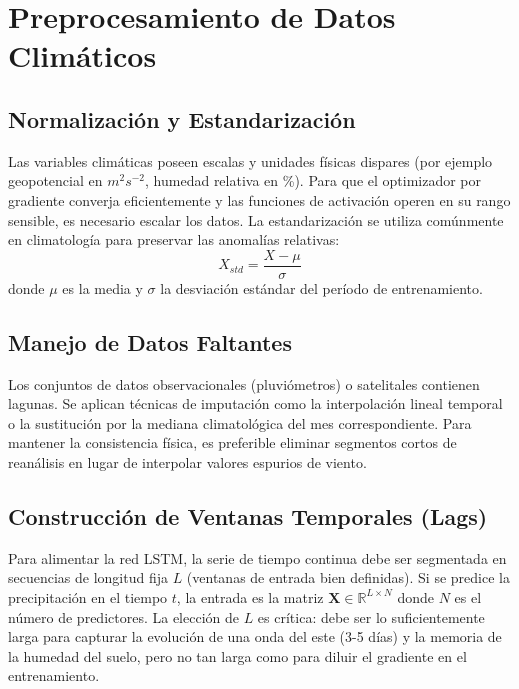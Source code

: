 \section{Preprocesamiento de Datos Climáticos}

\subsection{Normalización y Estandarización}
Las variables climáticas poseen escalas y unidades físicas dispares (por ejemplo geopotencial en \(m^2 s^{-2}\), humedad relativa en \%). Para que el optimizador por gradiente converja eficientemente y las funciones de activación operen en su rango sensible, es necesario escalar los datos. La estandarización se utiliza comúnmente en climatología para preservar las anomalías relativas:
\begin{equation}
    X_{std} = \frac{X - \mu}{\sigma}
\end{equation}
donde \(\mu\) es la media y \(\sigma\) la desviación estándar del período de entrenamiento.

\subsection{Manejo de Datos Faltantes}
Los conjuntos de datos observacionales (pluviómetros) o satelitales contienen lagunas. Se aplican técnicas de imputación como la interpolación lineal temporal o la sustitución por la mediana climatológica del mes correspondiente. Para mantener la consistencia física, es preferible eliminar segmentos cortos de reanálisis en lugar de interpolar valores espurios de viento.

\subsection{Construcción de Ventanas Temporales (Lags)}
Para alimentar la red LSTM, la serie de tiempo continua debe ser segmentada en secuencias de longitud fija \(L\) (ventanas de entrada bien definidas). Si se predice la precipitación en el tiempo \(t\), la entrada es la matriz \(\mathbf{X} \in \mathbb{R}^{L \times N}\) donde \(N\) es el número de predictores. La elección de \(L\) es crítica: debe ser lo suficientemente larga para capturar la evolución de una onda del este (3-5 días) y la memoria de la humedad del suelo, pero no tan larga como para diluir el gradiente en el entrenamiento.

